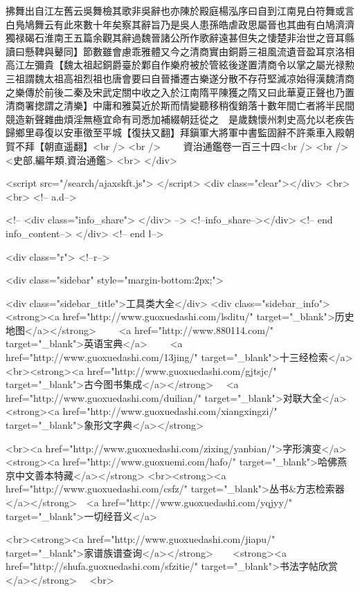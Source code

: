 拂舞出自江左舊云吳舞檢其歌非吳辭也亦陳於殿庭楊泓序曰自到江南見白符舞或言白鳬鳩舞云有此來數十年矣察其辭旨乃是吳人患孫皓虐政思屬晉也其曲有白鳩濟濟獨禄碣石淮南王五篇余觀其辭過魏晉諸公所作歌辭遠甚但失之悽楚非治世之音耳縣讀曰懸鞞與鼙同】節數雖會慮乖雅體又今之清商實由銅爵三祖風流遺音盈耳京洛相高江左彌貴【魏太祖起銅爵臺於鄴自作樂府被於管絃後遂置清商令以掌之屬光禄勲三祖謂魏太祖高祖烈祖也唐會要曰自晉播遷古樂遂分散不存苻堅滅凉始得漢魏清商之樂傳於前後二秦及宋武定關中收之入於江南隋平陳獲之隋又曰此華夏正聲也乃置清商署揔謂之清樂】中庸和雅莫近於斯而情變聽移稍復銷落十數年間亡者將半民間競造新聲雜曲煩淫無極宜命有司悉加補綴朝廷從之　是歲魏懷州刺史高允以老疾告歸鄉里尋復以安車徵至平城【復扶又翻】拜鎭軍大將軍中書監固辭不許乘車入殿朝賀不拜【朝直遥翻】<br />
<br />
　　資治通鑑卷一百三十四<br />
<br />
<史部,編年類,資治通鑑>  <br>
   </div> 

<script src="/search/ajaxskft.js"> </script>
 <div class="clear"></div>
<br>
<br>
 <!-- a.d-->

 <!--
<div class="info_share">
</div> 
-->
 <!--info_share--></div>   <!-- end info_content-->
  </div> <!-- end l-->

<div class="r">   <!--r-->



<div class="sidebar"  style="margin-bottom:2px;">

 
<div class="sidebar_title">工具类大全</div>
<div class="sidebar_info">
<strong><a href="http://www.guoxuedashi.com/lsditu/" target="_blank">历史地图</a></strong>　　
<a href="http://www.880114.com/" target="_blank">英语宝典</a>　　
<a href="http://www.guoxuedashi.com/13jing/" target="_blank">十三经检索</a>　
<br><strong><a href="http://www.guoxuedashi.com/gjtsjc/" target="_blank">古今图书集成</a></strong>　
<a href="http://www.guoxuedashi.com/duilian/" target="_blank">对联大全</a>　<strong><a href="http://www.guoxuedashi.com/xiangxingzi/" target="_blank">象形文字典</a></strong>　

<br><a href="http://www.guoxuedashi.com/zixing/yanbian/">字形演变</a>　　<strong><a href="http://www.guoxuemi.com/hafo/" target="_blank">哈佛燕京中文善本特藏</a></strong>
<br><strong><a href="http://www.guoxuedashi.com/csfz/" target="_blank">丛书&方志检索器</a></strong>　<a href="http://www.guoxuedashi.com/yqjyy/" target="_blank">一切经音义</a>　　

<br><strong><a href="http://www.guoxuedashi.com/jiapu/" target="_blank">家谱族谱查询</a></strong>　　<strong><a href="http://shufa.guoxuedashi.com/sfzitie/" target="_blank">书法字帖欣赏</a></strong>　
<br>

